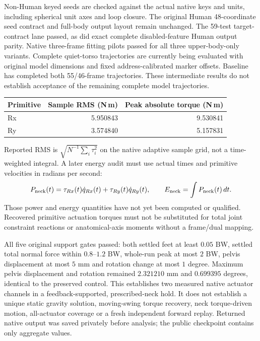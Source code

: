 \documentclass[11pt,a4paper]{article}
\begin{document}
Non-Human keyed seeds are checked against the actual native keys and
units, including spherical unit axes and loop closure. The original
Human 48-coordinate seed contract and full-body output layout remain
unchanged. The 59-test target-contract lane passed, as did exact complete
disabled-feature Human output parity. Native three-frame fitting pilots
passed for all three upper-body-only variants. Complete quiet-torso
trajectories are currently being evaluated with original model dimensions
and fixed address-calibrated marker offsets. Baseline has completed both
55/46-frame trajectories. These intermediate results do not establish
acceptance of the remaining complete model trajectories.
\begin{center}
\begin{tabular}{@{}lrr@{}}
\toprule
Primitive & Sample RMS (N\,m) & Peak absolute torque (N\,m)\\
\midrule
Rx & 5.950843 & 9.530841\\
Ry & 3.574840 & 5.157831\\
\bottomrule
\end{tabular}
\end{center}
Reported RMS is $\sqrt{N^{-1}\sum_i \tau_i^2}$ on the native adaptive sample
grid, not a time-weighted integral. A later energy audit must use actual
times and primitive velocities in radians per second:
\[
 P_{\rm neck}(t)=\tau_{Rx}(t)\dot q_{Rx}(t)+
                 \tau_{Ry}(t)\dot q_{Ry}(t),\qquad
 E_{\rm neck}=\int P_{\rm neck}(t)\,dt .
\]
Those power and energy quantities have not yet been computed or qualified.
Recovered primitive actuation torques must not be substituted for total joint
constraint reactions or anatomical-axis moments without a frame/dual mapping.

All five original support gates passed: both settled feet at least $0.05$ BW,
settled total normal force within $0.8$--$1.2$ BW, whole-run peak at most
$2$ BW, pelvis displacement at most $5$ mm and rotation change at most
$1$ degree. Maximum pelvis displacement and rotation remained
$2.321210$ mm and $0.699395$ degrees, identical to the preserved control.
This establishes two measured native actuator channels in a feedback-supported,
prescribed-neck hold. It does not establish a unique static gravity solution,
moving-swing torque recovery, neck torque-driven motion, all-actuator coverage
or a fresh independent forward replay. Returned native output was saved
privately before analysis; the public checkpoint contains only aggregate values.
\end{document}
